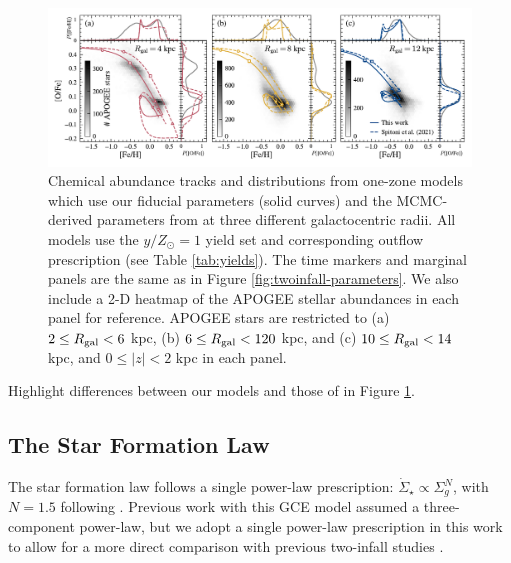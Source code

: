 \documentclass[twocolumn,twocolappendix,linenumbers]{aastex631}
\newcommand{\todo}[1]{{\color{red}#1}}
\begin{document}
\begin{figure}
    \centering
    \includegraphics{figures/spitoni_comparison.pdf}
    \caption{Chemical abundance tracks and distributions from one-zone models which use our fiducial parameters (solid curves) and the MCMC-derived parameters from \citet[][dashed curves]{spitoni_apogee_2021} at three different galactocentric radii. All models use the $y/Z_\odot=1$ yield set and corresponding outflow prescription (see Table \ref{tab:yields}). The time markers and marginal panels are the same as in Figure \ref{fig:twoinfall-parameters}. We also include a 2-D heatmap of the APOGEE stellar abundances in each panel for reference. APOGEE stars are restricted to (a) $2\leq R_{\rm gal}<6$ kpc, (b) $6\leq R_{\rm gal}<120$ kpc, and (c) $10\leq R_{\rm gal}<14$ kpc, and $0\leq |z|<2$ kpc in each panel.}
    \label{fig:spitoni-comparison}
\end{figure}

\todo{Highlight differences between our models and those of \citet{spitoni_apogee_2021} in Figure \ref{fig:spitoni-comparison}.} 

\subsection{The Star Formation Law}
\label{sec:sf-law}

The star formation law follows a single power-law prescription: $\dot\Sigma_\star\propto\Sigma_g^N$, with $N=1.5$ following \citet{kennicutt_global_1998}. Previous work with this GCE model \citep[e.g.,][]{johnson_stellar_2021,dubay_galactic_2024} assumed a three-component power-law, but we adopt a single power-law prescription in this work to allow for a more direct comparison with previous two-infall studies \citep[e.g.,][]{spitoni_remind_2024}. 
\end{document}
